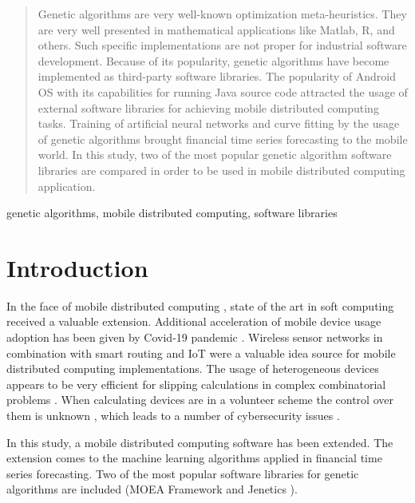 \documentclass[conference]{IEEEtran}
\begin{document}
\maketitle

\begin{abstract}
Genetic algorithms are very well-known optimization meta-heuristics. They are very well presented in mathematical applications like Matlab, R, and others. Such specific implementations are not proper for industrial software development. Because of its popularity, genetic algorithms have become implemented as third-party software libraries. The popularity of Android OS with its capabilities for running Java source code attracted the usage of external software libraries for achieving mobile distributed computing tasks. Training of artificial neural networks and curve fitting by the usage of genetic algorithms brought financial time series forecasting to the mobile world. In this study, two of the most popular genetic algorithm software libraries are compared in order to be used in mobile distributed computing application.
\end{abstract}

\begin{IEEEkeywords}
genetic algorithms, mobile distributed computing, software libraries
\end{IEEEkeywords}

\section{Introduction}

In the face of mobile distributed computing \cite{Bibi-2021-a}, state of the art in soft computing \cite{Angelova-2009-a} received a valuable extension. Additional acceleration of mobile device usage adoption has been given by Covid-19 pandemic \cite{Petrov-2021-a}. Wireless sensor networks \cite{Alexandrov-2016-a} in combination with smart routing \cite{Tashev-2019-a} and IoT \cite{Dineva-2019-a} were a valuable idea source for mobile distributed computing implementations. The usage of heterogeneous devices \cite{Weinbub-2012-a}  appears to be very efficient for slipping calculations in complex combinatorial problems \cite{Borissova-2015-a}. When calculating devices are in a volunteer scheme the control over them is unknown \cite{Balabanov-2020-a}, which leads to a number of cybersecurity issues \cite{Dimitrov-2021-a}. 

In this study, a mobile distributed computing software \cite{Balabanov-2022-a} has been extended. The extension comes to the machine learning algorithms applied in financial time series forecasting. Two of the most popular software libraries for genetic algorithms are included (MOEA Framework \cite{Huo-2018-a} and Jenetics \cite{Aalam-2022-a}). 
\end{document}
